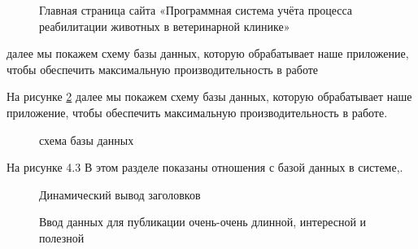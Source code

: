 \begin{figure}[H]
\caption{Главная страница сайта «Программная система учёта процесса реабилитации животных в ветеринарной клинике»}
\label{main:image}
\end{figure}

далее мы покажем схему базы данных, которую обрабатывает наше приложение, чтобы обеспечить максимальную производительность в работе


На рисунке \ref{menu:image} далее мы покажем схему базы данных, которую обрабатывает наше приложение, чтобы обеспечить максимальную производительность в работе.

\begin{figure}[H]
\caption{схема базы данных}
\label{menu:image}
\end{figure}

На рисунке 4.3 В этом разделе показаны отношения с базой данных в системе,.

\begin{figure}[H]
\caption{Динамический вывод заголовков}
\label{enter:image}	
\end{figure}

\begin{figure}[H]
	\caption{Ввод данных для публикации очень-очень длинной, интересной и полезной}
	\label{enter:image}
\end{figure}
